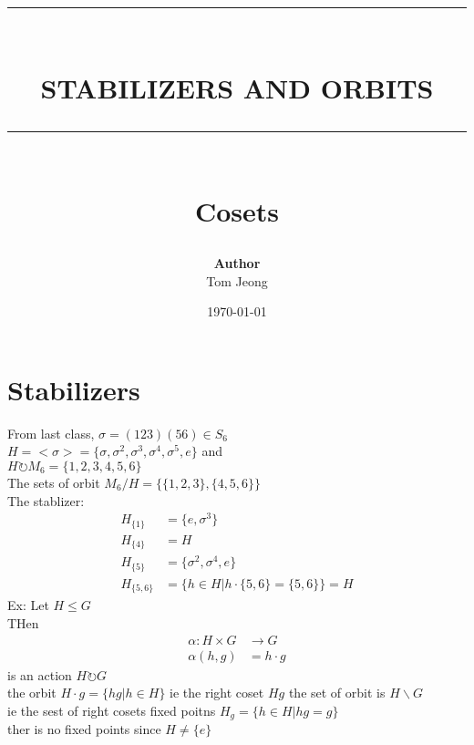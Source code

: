 \documentclass{article}
\newcommand{\HRule}[1]{\rule{\linewidth}{#1}}
\begin{document}

\title{ \normalsize \textsc{}
		\\ [2.0cm]
		\HRule{1.5pt} \\
		\LARGE \textbf{\uppercase{Stabilizers and Orbits}}
		\HRule{2.0pt} \\ [0.6cm] \LARGE{Cosets}
		}

\date{\today}
\author{\textbf{Author} \\ 
		Tom Jeong
        }

\maketitle
\newpage

\tableofcontents
\newpage

\section{Stabilizers}
From last class, $\sigma = (123)(56)  \in S_6$ \\ 
$H = <\sigma >  = \{\sigma, \sigma^2, \sigma^3, \sigma^4, \sigma^5, e\}$ 
and \\ $H \circlearrowright M_6 = \{1,2,3,4,5,6\}$ \\
The sets of orbit $M_6 / H = \{ \{1,2,3\}, \{4,5,6\} \}$ \\

The stablizer:
\begin{align*}
    H_{\{1\} } &= \{e, \sigma^3\} \\
    H_{\{4\} } &= H \\ 
    H_{\{5\} } &= \{\sigma^2, \sigma^4, e\} \\ 
    H_{\{5,6\} } &= \{h \in H | h \cdot \{5, 6\} = \{5, 6\} \} = H
\end{align*}
Ex: Let $H \leq G$ \\ 
THen\begin{align*}
    \alpha: H \times G &\to G \\ 
    \alpha(h, g) &= h \cdot g
\end{align*} is an action $H \circlearrowright G$ \\  the orbit $H \cdot g = \{hg | h \in H\}$
ie the right coset $Hg$ the set of orbit is $H \backslash G$   \\ 
ie the sest of right cosets 
fixed poitns $H_g = \{h \in H | hg = g\}$ \\ ther is no fixed points since $H \not = \{e\}$ \\ 
\end{document}
